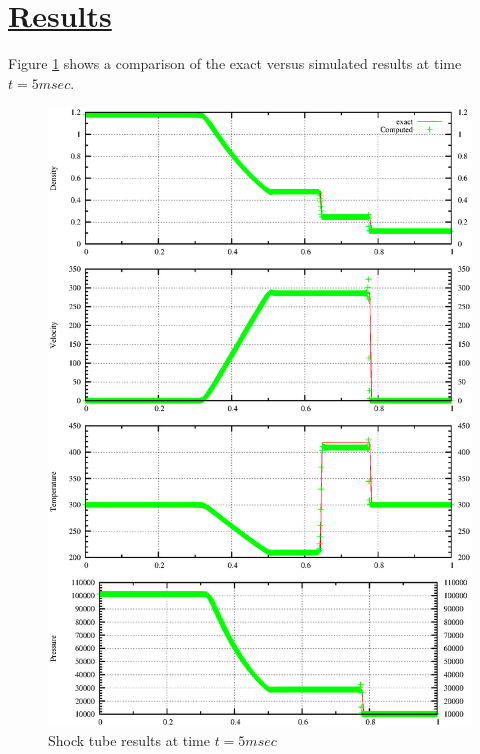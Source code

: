 \documentclass[fleqn]{article}
\begin{document}
\section*{\underline{Results}}
Figure \ref{results} shows a comparison of the exact versus simulated results at time $t = 5msec$.
\begin{figure}
\includegraphics[scale=.85]{figures/shockTube.ps}
\caption{Shock tube results at time $t = 5msec$}
\label{results}
\end{figure}
\newpage

\end{document}
